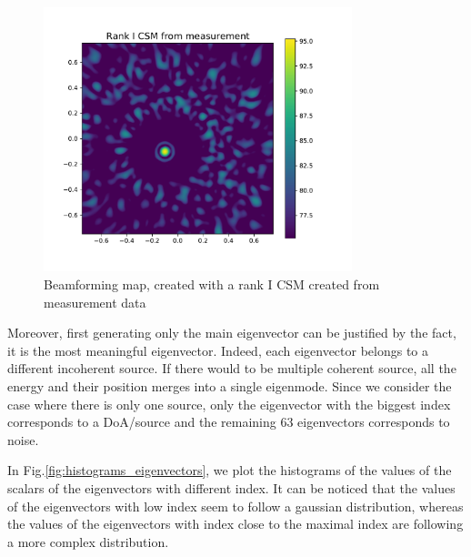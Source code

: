\documentclass[11pt,a4paper,twoside]{report}
\begin{document}
\begin{figure}
    \centering
    \includegraphics[width=0.8\textwidth]{figs/measurement_sample_rank_I_beamforming.pdf}
    \caption{Beamforming map, created with a rank I CSM created from measurement data}
    \label{fig:measurement_sample_rank_I_beamforming}
\end{figure}



Moreover, first generating only the main eigenvector can be justified by the fact, it is the most meaningful eigenvector. Indeed, each eigenvector belongs to a different incoherent source. If there would to be  multiple coherent source, all the energy and their position merges into a single eigenmode. Since we consider the case where there is only one source, only the eigenvector with the biggest index corresponds to a DoA/source and the remaining 63 eigenvectors corresponds to noise.  

In Fig.\ref{fig:histograms_eigenvectors}, we plot the histograms of the values of the scalars of the eigenvectors with different index. It can be noticed that the values of the eigenvectors with low index seem to follow a gaussian distribution, whereas the values of the eigenvectors with index close to the maximal index are following a more complex distribution.
\end{document}
